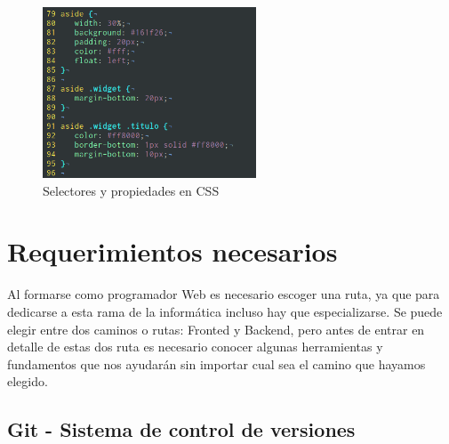 \documentclass[twocolumns,a4paper]{IEEEtran}
\begin{document}
\begin{figure}[ht]
   \centering
   \includegraphics[width=2.5in]{css_ejemplo}
   \caption{Selectores y propiedades en CSS}
   \label{fig:css_ejemplo}
\end{figure}























\section{Requerimientos necesarios}
Al formarse como programador Web es necesario escoger una ruta, ya que para
dedicarse a esta rama de la informática incluso hay que especializarse. Se
puede elegir entre dos caminos o rutas: Fronted y Backend, pero antes de entrar
en detalle de estas dos ruta es necesario conocer algunas herramientas y
fundamentos que nos ayudarán sin importar cual sea el camino que hayamos
elegido.
\subsection{Git - Sistema de control de versiones}
\cite{pascual199012}\cite{mycite2016}\cite{Chavez-Campos2016}\cite{webdev:2018:online}\cite{SergioLujan2001}\cite{NataliaVazquezWeb2007}\cite{WebDev:2018:online}\cite{ScottBenGit2014}\cite{Ssh:2018:online}\cite{HTTP:2018:online}\cite{HTTPS:2018:online}\cite{ChrisNegusLinux2005}\cite{JoyanesProg2008}\cite{GuidesGitHub:2018:online}\cite{HTMLw3:2018:online}\cite{PluralsightJavaScript:2018:online}\cite{JavaScriptw3:2018:online}\cite{PythonTuto:2018:online}\cite{IntroPython2008}


\printbibliography
\end{document}
